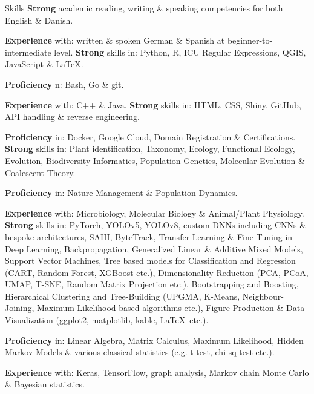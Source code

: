 
\begin{rubric}{Skills}
%
	\textbf{Strong} academic reading, writing \& speaking competencies for both English \& Danish.\par
    \textbf{Experience} with: 
    written \& spoken German \& Spanish at beginner-to-intermediate level.
%
%
	\textbf{Strong} skills in:
    Python, R, ICU Regular Expressions, QGIS, JavaScript \& \LaTeX.\par
    \textbf{Proficiency}  n:
    Bash, Go \& git.\par
    \textbf{Experience} with:
    C++ \& Java.
%
%
	\textbf{Strong} skills in:
    HTML, CSS, Shiny, GitHub, API handling \& reverse engineering.\par 
    \textbf{Proficiency} in:
    Docker, Google Cloud, Domain Registration \& Certifications.
%
%
    \textbf{Strong} skills in:
    Plant identification, Taxonomy, Ecology, Functional Ecology, Evolution, Biodiversity Informatics, Population Genetics, Molecular Evolution \& Coalescent Theory.\par
    \textbf{Proficiency} in:
    Nature Management \& Population Dynamics.\par
    \textbf{Experience} with:
     Microbiology, Molecular Biology \& Animal/Plant Physiology.
%
%
    \textbf{Strong} skills in:
    PyTorch, YOLOv5, YOLOv8, custom DNNs including CNNs \& bespoke architectures, SAHI, ByteTrack, Transfer-Learning \& Fine-Tuning in Deep Learning, Backpropagation, Generalized Linear \& Additive Mixed Models, Support Vector Machines, Tree based models for Classification and Regression (CART, Random Forest, XGBoost etc.), Dimensionality Reduction (PCA, PCoA, UMAP, T-SNE, Random Matrix Projection etc.), Bootstrapping and Boosting, Hierarchical Clustering and Tree-Building (UPGMA, K-Means, Neighbour-Joining, Maximum Likelihood based algorithms etc.), Figure Production \& Data Visualization (ggplot2, matplotlib, kable, \LaTeX\, etc.).\par
    \textbf{Proficiency} in:
    Linear Algebra, Matrix Calculus, Maximum Likelihood, Hidden Markov Models \& various classical statistics (e.g. t-test, chi-sq test etc.).\par
    \textbf{Experience} with:
    Keras, TensorFlow, graph analysis, Markov chain Monte Carlo \& Bayesian statistics.
\end{rubric}
